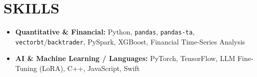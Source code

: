 \documentclass[letterpaper,11pt]{article}
\newcommand{\cvitem}[1]{
  \item\small{
    {#1\vspace{-2pt}}
  }
}
\newcommand{\cvitemstart}{\begin{itemize}\justifying}
\newcommand{\cvitemend}{\end{itemize}\vspace{-5pt}}
\begin{document}
\section{\textbf{SKILLS}}
\cvitemstart
  \cvitem{\textbf{Quantitative \& Financial:} Python, \texttt{pandas}, \texttt{pandas-ta}, \texttt{vectorbt}/\texttt{backtrader}, PySpark, XGBoost, Financial Time-Series Analysis}
  \cvitem{\textbf{AI \& Machine Learning / Languages:} PyTorch, TensorFlow, LLM Fine-Tuning (LoRA), C++, JavaScript, Swift}
\cvitemend
\end{document}
